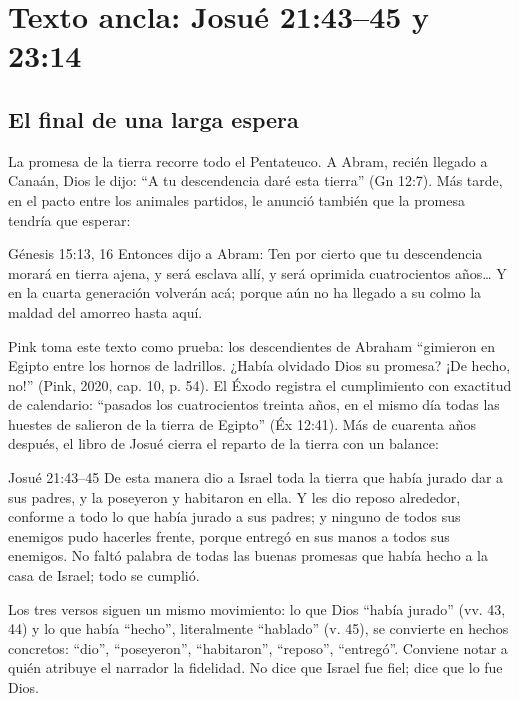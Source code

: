 \section{Texto ancla: Josué 21:43--45 y 23:14}\label{sec:josue-fiel}

\subsection{El final de una larga espera}
La promesa de la tierra recorre todo el Pentateuco. A Abram, recién llegado a Canaán, Dios le dijo: ``A tu descendencia daré esta tierra'' (Gn 12:7). Más tarde, en el pacto entre los animales partidos, le anunció también que la promesa tendría que esperar:

\begin{verso}{Génesis 15:13, 16}
Entonces \SENOR{} dijo a Abram: Ten por cierto que tu descendencia morará en tierra ajena, y será esclava allí, y será oprimida cuatrocientos años\ldots{} Y en la cuarta generación volverán acá; porque aún no ha llegado a su colmo la maldad del amorreo hasta aquí.
\end{verso}

Pink toma este texto como prueba: los descendientes de Abraham ``gimieron en Egipto entre los hornos de ladrillos. ¿Había olvidado Dios su promesa? ¡De hecho, no!'' (Pink, 2020, cap. 10, p. 54). El Éxodo registra el cumplimiento con exactitud de calendario: ``pasados los cuatrocientos treinta años, en el mismo día todas las huestes de \SENOR{} salieron de la tierra de Egipto'' (Éx 12:41). Más de cuarenta años después, el libro de Josué cierra el reparto de la tierra con un balance:

\begin{verso}{Josué 21:43–45}
De esta manera dio \SENOR{} a Israel toda la tierra que había jurado dar a sus padres, y la poseyeron y habitaron en ella. Y \SENOR{} les dio reposo alrededor, conforme a todo lo que había jurado a sus padres; y ninguno de todos sus enemigos pudo hacerles frente, porque \SENOR{} entregó en sus manos a todos sus enemigos. No faltó palabra de todas las buenas promesas que \SENOR{} había hecho a la casa de Israel; todo se cumplió.
\end{verso}

Los tres versos siguen un mismo movimiento: lo que Dios ``había jurado'' (vv. 43, 44) y lo que había ``hecho'', literalmente ``hablado'' (v. 45), se convierte en hechos concretos: ``dio'', ``poseyeron'', ``habitaron'', ``reposo'', ``entregó''. Conviene notar a quién atribuye el narrador la fidelidad. No dice que Israel fue fiel; dice que lo fue Dios.

